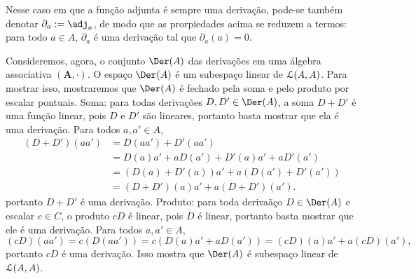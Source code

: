 Nesse caso em que a função adjunta é sempre uma derivação, pode-se também denotar $\partial_a := \adj_a$, de modo que as prorpiedades acima se reduzem a termos: para todo $a \in A$, $\partial_a$ é uma derivação tal que $\partial_a(a)=0$.

Consideremos, agora, o conjunto $\Der(A)$ das derivações em uma álgebra associativa $(\bm A, \cdot)$. O espaço $\Der(A)$ é um subespaço linear de $\mathcal{L}(A,A)$. Para mostrar isso, mostraremos que $\Der(A)$ é fechado pela soma e pelo produto por escalar pontuais. Soma: para todas derivações $D,D' \in \Der(A)$, a soma $D+D'$ é uma função linear, pois $D$ e $D'$ são lineares, portanto basta mostrar que ela é uma derivação. Para todos $a,a' \in A$,
	\begin{align*}
	(D+D')(aa') &= D(aa') + D'(aa') \\
		&= D(a)a' + aD(a') + D'(a)a' + aD'(a') \\
		&= (D(a)+D'(a))a' + a(D(a')+D'(a')) \\
		&= (D+D')(a)a' + a(D+D')(a').
	\end{align*}
portanto $D+D'$ é uma derivação. Produto: para toda derivaãço $D \in \Der(A)$ e escalar $c \in C$, o produto $cD$ é linear, pois $D$ é linear, portanto basta mostrar que ele é uma derivação. Para todos $a,a' \in A$,
	\begin{equation*}
	(cD)(aa') = c(D(aa')) = c(D(a)a' + aD(a')) = (cD)(a)a' + a(cD)(a'),
	\end{equation*}
portanto $cD$ é uma derivação. Isso mostra que $\Der(A)$ é subespaço linear de $\mathcal{L}(A,A)$.

